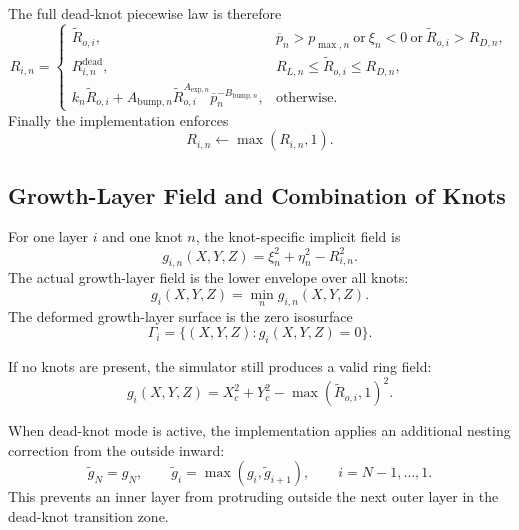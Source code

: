 \documentclass[11pt]{article}
\begin{document}
The full dead-knot piecewise law is therefore
\begin{equation}
R_{i,n}
=
\begin{cases}
\widetilde{R}_{o,i}, &
\overline{p}_n > p_{\max,n}
\ \text{or}\ \xi_n < 0
\ \text{or}\ \widetilde{R}_{o,i} > R_{D,n}, \\[4pt]
R_{i,n}^{\mathrm{dead}}, &
R_{L,n} \le \widetilde{R}_{o,i} \le R_{D,n}, \\[4pt]
k_n \widetilde{R}_{o,i}
+
A_{\mathrm{bump},n}\widetilde{R}_{o,i}^{A_{\mathrm{exp},n}}
\overline{p}_n^{-B_{\mathrm{bump},n}}, &
\text{otherwise}.
\end{cases}
\end{equation}
Finally the implementation enforces
\begin{equation}
R_{i,n} \leftarrow \max(R_{i,n},1).
\end{equation}

\subsection{Growth-Layer Field and Combination of Knots}

For one layer $i$ and one knot $n$, the knot-specific implicit field is
\begin{equation}
g_{i,n}(X,Y,Z) = \xi_n^2 + \eta_n^2 - R_{i,n}^2.
\end{equation}
The actual growth-layer field is the lower envelope over all knots:
\begin{equation}
g_i(X,Y,Z) = \min_n g_{i,n}(X,Y,Z).
\end{equation}
The deformed growth-layer surface is the zero isosurface
\begin{equation}
\Gamma_i = \{(X,Y,Z) : g_i(X,Y,Z) = 0\}.
\end{equation}

If no knots are present, the simulator still produces a valid ring field:
\begin{equation}
g_i(X,Y,Z) = X_c^2 + Y_c^2 - \max(\widetilde{R}_{o,i},1)^2.
\end{equation}

When dead-knot mode is active, the implementation applies an additional nesting correction from the outside
inward:
\begin{equation}
\widetilde{g}_N = g_N,
\qquad
\widetilde{g}_i = \max(g_i, \widetilde{g}_{i+1}),
\qquad
i = N-1,\ldots,1.
\end{equation}
This prevents an inner layer from protruding outside the next outer layer in the dead-knot transition zone.
\end{document}
